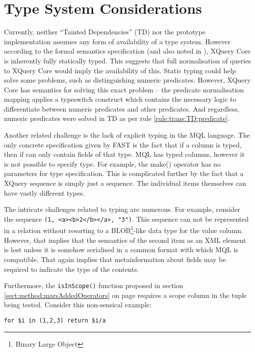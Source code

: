\section{Type System Considerations}
\label{sect:disc:typeSystem}
Currently, neither ``Tainted Dependencies'' (TD) nor the prototype
implementation assumes any form of availability of a type system. However
according to the formal semantics specification\cite{xquery_semantics} (and
also noted in \cite{pathfinder_compiling_xquery}), XQuery Core is inherently
fully statically typed. This suggests that full normalisation of queries to
XQuery Core would imply the availability of this. Static typing could help
solve some problems, such as distinguishing numeric predicates. However, XQuery
Core has semantics for solving this exact problem -- the predicate normalisation
mapping applies a typeswitch construct which contains the necessary logic to
differentiate between numeric predicates and other predicates. And regardless,
numeric predicates were solved in TD as per rule \ref{rule:trans:TD:predicate}.

Another related challenge is the lack of explicit typing in the MQL language.
The only concrete specification given by FAST is the fact that if a column is
typed, then if can only contain fields of that type. MQL has typed columns,
however it is not possible to specify type. For example, the \textsf{make()}
operator has no parameters for type specification. This is complicated further
by the fact that a XQuery sequence is simply just a sequence. The individual
items themselves can have vastly different types.

The intricate challenges related to typing are numerous. For example, consider
the sequence \texttt{(1, <a><b>2</b></a>, "3")}. This sequence can not be
represented in a relation without resorting to a BLOB\footnote{Binary
Large Object}-like data type for the value column. However, that implies that
the semantics of the second item as an XML element is lost unless it is somehow
serialised in a common format with which MQL is compatible. That again implies
that metainformation about fields may be required to indicate the type of the
contents.

Furthermore, the \texttt{isInScope()} function proposed in section
\ref{sect:method:marsAddedOperators} on page
\pageref{sect:method:marsAddedOperators} requires a scope column in the tuple
being tested. Consider this non-sensical example:

\begin{Verbatim}
for $i in (1,2,3) return $i/a
\end{Verbatim}

